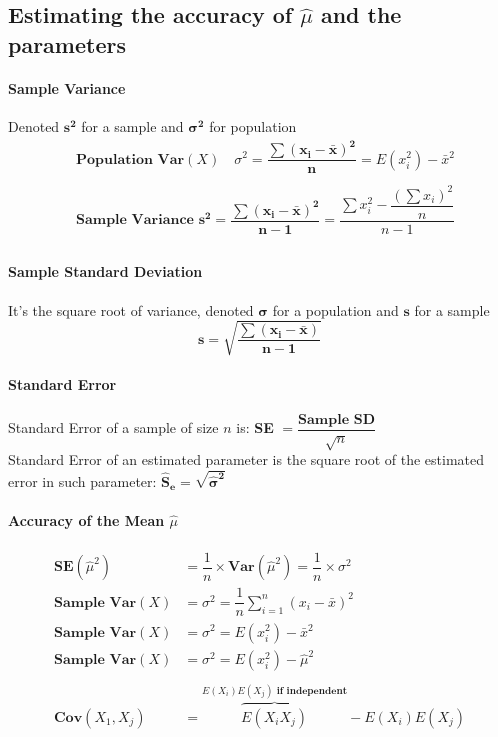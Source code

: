 \documentclass[12pt,a4paper]{report}
\begin{document}
\subsection{Estimating the accuracy of $\hat{\mu}$ and the parameters}
\paragraph{Sample Variance } Denoted  $\mathbf{s^{2}}$ for a sample and $\mathbf{\sigma^{2}}$ for population 
\begin{align*}
&\textbf{Population Var}(X) \quad \sigma^{2}  = \mathbf{ \dfrac{\sum (x_{i}-\bar{x})^{2}}{n}}=E(x_{i}^{2}) -\bar{x}^{2}\\
\\
&\textbf{Sample Variance }\mathbf{s^{2}= \dfrac{\sum (x_{i}-\bar{x})^{2}}{n-1}}=\dfrac{\sum x_{i}^{2} - \dfrac{(\sum x_{i})^{2}}{n}}{n-1}
\\
\end{align*}

\paragraph{Sample Standard Deviation} It's the square root of variance, denoted $\mathbf{\sigma}$ for a population and $\mathbf{s}$ for a sample
\[
\mathbf{s= \sqrt{\dfrac{\sum (x_{i}-\bar{x})}{n-1}}}
\]

\paragraph{Standard Error}
Standard Error of a sample of size $n$ is: \textbf{SE }$=\dfrac{\textbf{Sample SD}}{\sqrt{n}}$\\
Standard Error of an estimated parameter is the square root of the estimated error in such parameter: $\mathbf{\hat{\textbf{S}}_{e} = \sqrt{\hat{\sigma}^{2}}}$
\paragraph{Accuracy of the Mean $\hat{\mu}$}
\begin{align*}
\textbf{SE}(\hat{\mu}^{2}) &=\dfrac{1}{n} \times  \textbf{Var}(\hat{\mu}^{2}) =\dfrac{1}{n} \times  \sigma^{2}  \\
\textbf{Sample Var}(X) &= \sigma^{2}  =\dfrac{1}{n}\sum_{i=1}^{n} (x_{i}-\bar{x})^{2}\\
\textbf{Sample Var}(X) &= \sigma^{2}  = E(x_{i}^{2}) -\bar{x}^{2}\\
\textbf{Sample Var}(X) &= \sigma^{2}  = E(x_{i}^{2}) -\hat{\mu}^{2}\\
\\
\textbf{Cov}(X_{1}, X_{j}) &=\overbrace{E(X_{i}X_{j})}^{E(X_{i})E(X_{j}) \textbf{ if independent}}-E(X_{i})E(X_{j})
\end{align*}
\end{document}

